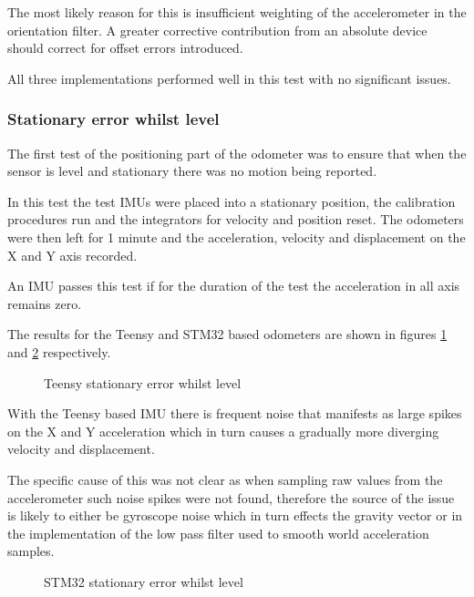 \documentclass{entcs}
\begin{document}
The most likely reason for this is insufficient weighting of the accelerometer
in the orientation filter. A greater corrective contribution from an absolute
device should correct for offset errors introduced.

All three implementations performed well in this test with no significant
issues.

\subsubsection{Stationary error whilst level}

The first test of the positioning part of the odometer was to ensure that when
the sensor is level and stationary there was no motion being reported.

In this test the test IMUs were placed into a stationary position, the
calibration procedures run and the integrators for velocity and position reset.
The odometers were then left for 1 minute and the acceleration, velocity and
displacement on the X and Y axis recorded.

An IMU passes this test if for the duration of the test the acceleration in all
axis remains zero.

The results for the Teensy and STM32 based odometers are shown in figures
\ref{fig:teensy_stationary_level_error} and
\ref{fig:stm32_stationary_level_error} respectively.

\begin{figure}[h!]
  \centering
  \scalebox{0.7}{}
  \caption{Teensy stationary error whilst level}
  \label{fig:teensy_stationary_level_error}
\end{figure}

With the Teensy based IMU there is frequent noise that manifests as large spikes
on the X and Y acceleration which in turn causes a gradually more diverging
velocity and displacement.

The specific cause of this was not clear as when sampling raw values from the
accelerometer such noise spikes were not found, therefore the source of the
issue is likely to either be gyroscope noise which in turn effects the gravity
vector or in the implementation of the low pass filter used to smooth
world acceleration samples.

\begin{figure}[h!]
  \centering
  \scalebox{0.7}{}
  \caption{STM32 stationary error whilst level}
  \label{fig:stm32_stationary_level_error}
\end{figure}
\end{document}
